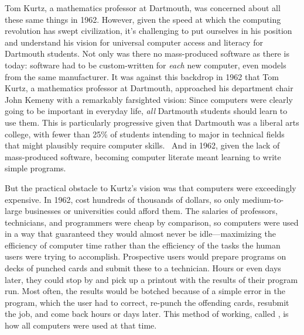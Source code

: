 \documentclass{article}
\begin{document}
Tom Kurtz, a mathematics professor at Dartmouth, was concerned about all
these same things in 1962.
However, given the speed at which the computing revolution has swept
civilization, it's challenging to put ourselves in his position and
understand his vision for universal computer access and literacy for
Dartmouth students.
Not only was there no mass-produced software as
there is today: software  had to be custom-written for \emph{each} new
computer, even models from the same manufacturer.  
It was against this backdrop 
in 1962 that Tom Kurtz, a mathematics professor at Dartmouth, approached
his department chair John Kemeny with a remarkably farsighted vision:
Since computers were clearly going to be important in everyday
life, \emph{all} Dartmouth students should learn to use them.  This is
particularly progressive given that Dartmouth was a liberal arts college,
with fewer than 25\% of students intending to major in technical fields that might
plausibly require computer skills.~\cite{goto}
And in 1962, given the lack of mass-produced software,
becoming computer literate meant learning to
write simple programs.

But the practical obstacle to Kurtz's vision was that
computers were exceedingly expensive.  In 1962,  
cost hundreds of thousands of dollars, so only medium-to-large 
businesses or universities could afford them.  
The salaries of professors, technicians, and programmers were
cheap by comparison, so computers were used in a way that guaranteed
they would almost never be idle---maximizing the efficiency of computer
time rather than the efficiency of the tasks the human users were trying
to accomplish.
Prospective users would prepare programs on decks of punched
cards and submit these to a technician.  
Hours or even days later, they
could stop by and pick up a printout with the results of their program run.
Most often, the results would be botched because of a simple error in
the program, which the user had to correct, re-punch the offending
cards, resubmit the job, and come back hours or days later.  This method
of working, called , is how all computers were used
at that time.
\end{document}
